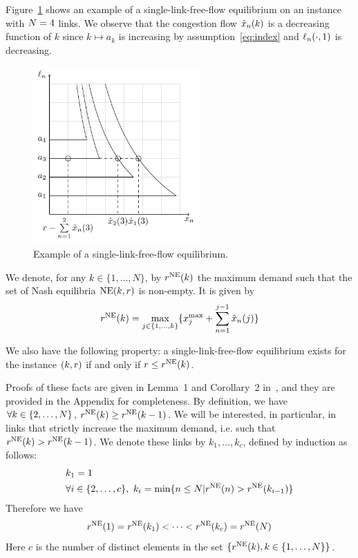 Figure~\ref{fig:ff_nash} shows an example of a single-link-free-flow equilibrium on an instance with $N = 4$ links. We observe that the congestion flow $\hat{x}_{n} ( k )$ is a decreasing function of $k$ since $k \mapsto a_k$ is increasing by assumption~\eqref{eq:index} and $\ell_n(\cdot, 1)$ is decreasing.
\begin{figure}[h]
\centering
\includegraphics[width=2.5in]{TikZ/ff_nash.pdf}
\caption{Example of a single-link-free-flow equilibrium.}
\label{fig:ff_nash}
\end{figure}
%

\begin{definition}
\label{def:maxDemand}
We denote, for any $k\in \{1,\ldots,N\}$, by $r^{\textup{NE}} ( k )$ the maximum demand such that the set of Nash equilibria $\textup{NE} (k, r)$ is non-empty. It is given by
\begin{equation}
r^{\textup{NE}} ( k ) = \max_{ j \in \{1,\dots, k\} } \{x^{\max}_j + \sum_{n=1}^{j-1} \hat{x}_{n} ( j ) \}
\end{equation}
\end{definition}

\begin{remark}
\label{remark:maxDemand}
We also have the following property: a single-link-free-flow equilibrium exists for the instance $(k, r)$ if and only if $r \leq r^{\textup{NE}} ( k )$.
\end{remark}

Proofs of these facts are given in Lemma~1 and Corollary~2 in~\cite{krichene12}, and they are provided in the Appendix for completeness. By definition, we have $\forall k \in \{2, \dots, N \}$, ${ r^{\textup{NE}} ( k ) \geq r^{\textup{NE}} ( k-1 ) }$. We will be interested, in particular, in links that strictly increase the maximum demand, i.e. such that $r^{\textup{NE}} ( k ) > r^{\textup{NE}} ( k-1 )$. We denote these links by $k_1, \dots, k_c$, defined by induction as follows:
\begin{align}
& k_1 = 1 \\
& \forall i \in \{2, \dots, c\}, \ k_{i} = \min \{n \leq N | r^{\textup{NE}} ( n ) > r^{\textup{NE}} ( k_{i-1} )\} \label{eq:nj}
\end{align}
Therefore we have
\[
r^{\textup{NE}} ( 1 ) = r^{\textup{NE}} ( k_1 ) < \dots < r^{\textup{NE}} ( k_c ) = r^{\textup{NE}} ( N )
\]
Here $c$ is the number of distinct elements in the set $\{r^{\textup{NE}} ( k ), k \in \{1, \dots, N\}\}$.


